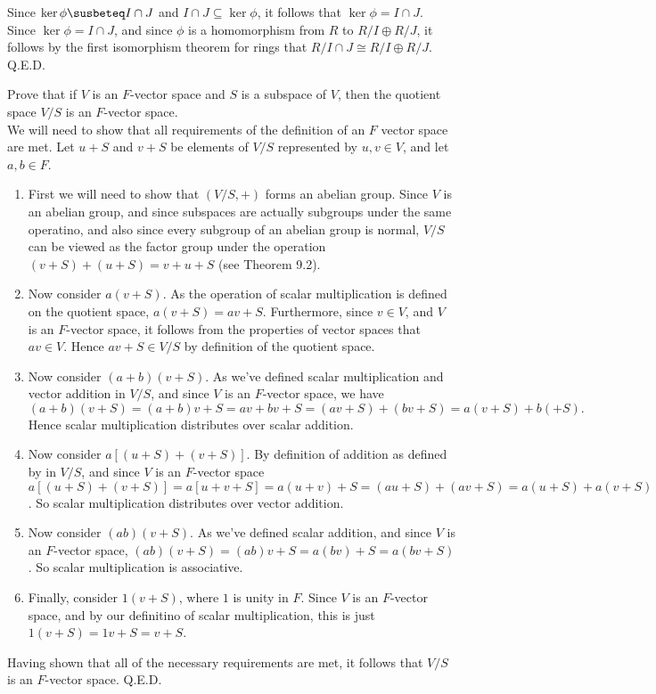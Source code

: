 \documentclass{article}
\begin{document}
Since $\ker\phi\susbeteq I\cap J$ and $I\cap J\subseteq \ker\phi$, it follows that $\ker\phi = I\cap J$.\\

Since $\ker\phi = I \cap J$, and since $\phi$ is a homomorphism from $R$ to $R/I\oplus R/J$, it follows by the first isomorphism theorem for rings that $R/I\cap J \cong R/I \oplus R/J$. Q.E.D.

\newpage

 Prove that if $V$ is an $F$-vector space and $S$ is a subspace of $V$, then the quotient space $V/S$ is an $F$-vector space.\\

 We will need to show that all requirements of the definition of an $F$ vector space are met. Let $u + S$ and $v + S$ be elements of $V/S$ represented by $u,v\in V$, and let $a,b\in F$.
\begin{enumerate}
    \item First we will need to show that $(V/S,+)$ forms an abelian group. Since $V$ is an abelian group, and since subspaces are actually subgroups under the same operatino, and also since every subgroup of an abelian group is normal, $V/S$ can be viewed as the factor group under the operation $(v + S)+ (u + S) = v + u + S$ (see Theorem 9.2).
    \item Now consider $a(v + S)$. As the operation of scalar multiplication is defined on the quotient space, $a(v + S) = av + S$. Furthermore, since $v\in V$, and $V$ is an $F$-vector space, it follows from the properties of vector spaces that $av\in V$. Hence $av + S\in V/S$ by definition of the quotient space.
    \item Now consider $(a + b)(v+S)$. As we've defined scalar multiplication and vector addition in $V/S$, and since $V$ is an $F$-vector space, we have $(a+b)(v + S) = (a+ b)v + S = av + bv + S = (av + S) + (bv + S) = a(v + S) + b( + S).$ Hence scalar multiplication distributes over scalar addition.
    \item Now consider $a[(u + S)+(v+S)]$. By definition of addition as defined by in $V/S$, and since $V$ is an $F$-vector space $a[(u + S)+(v+S)] = a[u + v + S] = a(u + v) + S = (au + S) + (av + S) = a(u + S) + a(v + S)$. So scalar multiplication distributes over vector addition. 
    \item Now consider $(ab)(v + S)$. As we've defined scalar addition, and since $V$ is an $F$-vector space, $(ab)(v + S) = (ab)v + S = a(bv) + S = a(bv + S)$. So scalar multiplication is associative.
    \item Finally, consider $1(v + S)$, where $1$ is unity in $F$. Since $V$ is an $F$-vector space, and by our definitino of scalar multiplication, this is just $1(v + S) = 1v + S = v + S$. 
\end{enumerate}

Having shown that all of the necessary requirements are met, it follows that $V/S$ is an $F$-vector space. Q.E.D.
\end{document}
